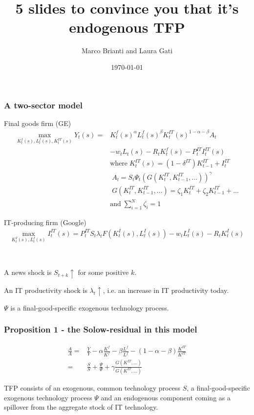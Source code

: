 \documentclass{beamer}
\author[Brianti, Gati]{Marco Brianti and Laura Gati}
\institute[Boston College]{Boston College}
\title{5 slides to convince you that it's endogenous TFP}
\date{\today}
\begin{document}
\begin{frame}

\maketitle


\end{frame}


\begin{frame}
\frametitle{A two-sector model}

Final goods firm (GE)
\begin{align*}
\max_{K^f_t(s), L^f_t(s), K^{IT}_t(s) } Y_t(s) =  & K^f_t(s)^{\alpha}L^f_t(s)^{\beta}K^{IT}_t(s)^{1-\alpha - \beta}A_t \\
 & - w_t L_t(s) -R_tK^f_t(s) -P^{IT}_t I^{IT}_t(s) \\
 & \text{where} \; K^{IT}_t(s) =  (1-\delta^{IT})K^{IT}_{t-1} + I^{IT}_t \\
 &  \; A_t =  S_t \Psi_t (G(K^{IT}_t,K^{IT}_{t-1},\dots))^{\gamma} \\
 &  \; G(K^{IT}_t,K^{IT}_{t-1},\dots) = \zeta_1 K_t^{IT} + \zeta_2 K^{IT}_{t-1} + \dots \\
  & \text{and} \; \sum_{i=1}^{N} \zeta_i = 1
\end{align*}

\end{frame}

\begin{frame}

IT-producing firm (Google)
\begin{align*}
\max_{K^{I}_t(s), L^{I}_t(s)} I^{IT}_t(s) = P^{IT}_t S_t \lambda_t F(K^I_t(s), L^I_t(s)) -w_t L^I_t(s) - R_t K^I_t(s)
\end{align*}

\

A news shock is $S_{t+k} \uparrow$ for some positive $k$. 

An IT productivity shock is $\lambda_{t} \uparrow$, i.e. an increase in IT productivity today. 

$\Psi$ is a final-good-specific exogenous technology process.

\end{frame}

\begin{frame}
\frametitle{Proposition 1 - the Solow-residual in this model}

\begin{align*}
\frac{\dot{A}}{A} = & \frac{\dot{Y}}{Y} - \alpha \frac{\dot{K^f}}{K^f} - \beta \frac{\dot{L^f}}{L^f} - (1-\alpha - \beta) \frac{\dot{K^{IT}}}{K^{IT}} \\
= & \frac{\dot{S}}{S} + \frac{\dot{\Psi}}{\Psi} + \gamma \frac{\dot{G}(K^{IT},...)}{G(K^{IT},...)}
\end{align*}

TFP consists of an exogenous, common technology process $S$, a final-good-specific exogenous technology process $\Psi$ and an endogenous component coming as a spillover from the aggregate stock of IT technology. 
\end{frame}
\end{document}
